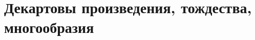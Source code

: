 \documentclass[../main/document.tex]{subfiles}
\begin{document}
\section{Декартовы произведения, тождества, многообразия}
\end{document}
